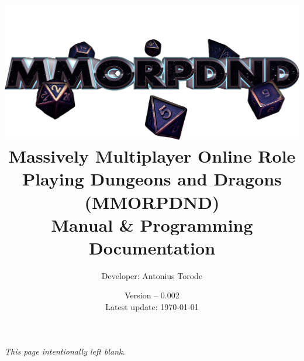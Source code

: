 \documentclass[openany,a4paper,10pt]{book}
\title{\vspace{0.1cm}  \includegraphics[scale=0.18]{./images/man_cover.png} \vspace{.5cm} \\ Massively Multiplayer Online Role Playing Dungeons and Dragons (MMORPDND) \\  Manual \& Programming Documentation}
\author{Developer: Antonius Torode}
\date{Version -- 0.002 \\ Latest update: \today}
\begin{document}
\frontmatter
\maketitle

\tableofcontents
\newpage
\vspace*{\fill}
\begin{center}
	\textit{This page intentionally left blank.}
\end{center}
\vspace*{\fill}

\mainmatter
\pagestyle{fancy}
\fancyhf{}
\fancyhead[RO, LE]{\thepage}










\backmatter


\printindex
\end{document}
